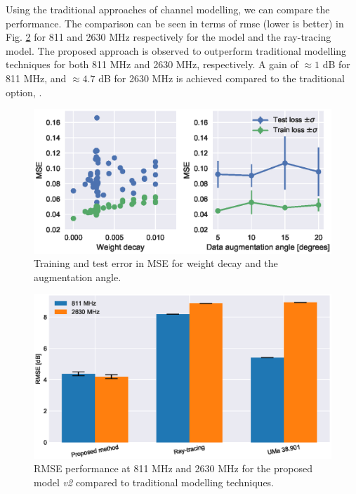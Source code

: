 Using the traditional approaches of channel modelling, we can compare the performance. The comparison can be seen in terms of \gls{rmse} (lower is better) in Fig. \ref{fig:model_comparison_bar_group} for 811 and 2630 MHz respectively for the  model and the ray-tracing model. The proposed approach is observed to outperform traditional modelling techniques for both 811 MHz and 2630 MHz, respectively. A gain of $\approx 1$ dB for 811 MHz, and $\approx 4.7$ dB for 2630 MHz is achieved compared to the traditional option, . 
\begin{figure}
    \centering
    \includegraphics{chapters/part_pathloss/model_aided_paper/hyperparameters_grayscale.eps}
    \caption{Training and test error in MSE for weight decay and the augmentation angle.}
    \label{fig:hyperparameters_weight_decay}
\end{figure}

\begin{figure}
    \centering
    \includegraphics{chapters/part_pathloss/model_aided_paper/model_comparison_bar_group_std_split.eps}
    \caption{RMSE performance at 811 MHz and 2630 MHz for the proposed model \emph{v2} compared to traditional modelling techniques.}
    \label{fig:model_comparison_bar_group}
\end{figure}

